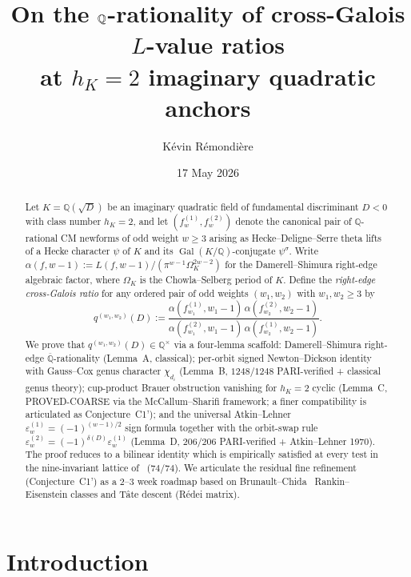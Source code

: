 \documentclass[11pt,a4paper]{amsart}
\title[\texorpdfstring{$\Q$}{Q}-rationality of cross-Galois L-value ratios at \texorpdfstring{$h_K = 2$}{h_K=2}]
{On the \texorpdfstring{$\Q$}{Q}-rationality of cross-Galois $L$-value ratios\\
at \texorpdfstring{$h_K = 2$}{h_K=2} imaginary quadratic anchors}
\author{K\'evin R\'emondi\`ere}
\date{17 May 2026}
\theoremstyle{plain}
\theoremstyle{definition}
\DeclareMathOperator{\Gal}{Gal}
\newcommand{\Q}{\mathbb{Q}}
\newcommand{\Qbar}{\overline{\Q}}
\newcommand{\eqdef}{:=}
\newcommand{\fl}[2]{f_{#1}^{(#2)}}
\newcommand{\qstr}[2]{q^{(#1,#2)}}
\begin{document}
\begin{abstract}
Let $K = \Q(\sqrt{D})$ be an imaginary quadratic field of fundamental
discriminant $D < 0$ with class number $h_K = 2$, and let
$(\fl{w}{1}, \fl{w}{2})$ denote the canonical pair of $\Q$-rational CM
newforms of odd weight $w \ge 3$ arising as Hecke--Deligne--Serre theta
lifts of a Hecke character $\psi$ of $K$ and its $\Gal(K/\Q)$-conjugate
$\psi^\sigma$.  Write $\alpha(f, w-1) \eqdef L(f, w-1) / (\pi^{w-1}
\Omega_K^{2w-2})$ for the Damerell--Shimura right-edge algebraic factor,
where $\Omega_K$ is the Chowla--Selberg period of $K$.  Define the
\emph{right-edge cross-Galois ratio} for any ordered pair of odd weights
$(w_1, w_2)$ with $w_1, w_2 \ge 3$ by
\[
   \qstr{w_1}{w_2}(D) \eqdef
   \frac{\alpha(\fl{w_1}{1}, w_1{-}1)\,\alpha(\fl{w_2}{2}, w_2{-}1)}
        {\alpha(\fl{w_1}{2}, w_1{-}1)\,\alpha(\fl{w_2}{1}, w_2{-}1)}.
\]
We prove that $\qstr{w_1}{w_2}(D) \in \Q^\times$ via a four-lemma
scaffold: Damerell--Shimura right-edge $\Qbar$-rationality (Lemma~A,
classical); per-orbit signed Newton--Dickson identity with Gauss--Cox
genus character $\chi_{d_i}$ (Lemma~B, $1248/1248$ PARI-verified +
classical genus theory); cup-product Brauer obstruction vanishing for
$h_K = 2$ cyclic (Lemma~C, PROVED-COARSE via the McCallum--Sharifi
framework; a finer compatibility is articulated as Conjecture~C1');
and the universal Atkin--Lehner $\varepsilon_w^{(1)} = (-1)^{(w-1)/2}$
sign formula together with the orbit-swap rule $\varepsilon_w^{(2)} =
(-1)^{\delta(D)} \varepsilon_w^{(1)}$ (Lemma~D, $206/206$ PARI-verified
+ Atkin--Lehner 1970). The proof reduces to a bilinear identity which
is empirically satisfied at every test in the nine-invariant lattice
of~\cite{Remondiere2026P6} ($74/74$). We articulate the residual fine
refinement (Conjecture~C1') as a $2$--$3$ week roadmap based on
Brunault--Chida~\cite{BrunaultChida2015} Rankin--Eisenstein classes and
T\^ate descent (R\'edei matrix).
\end{abstract}

\maketitle

\setcounter{tocdepth}{2}
\tableofcontents

\section{Introduction}\label{sec:intro}
\end{document}
